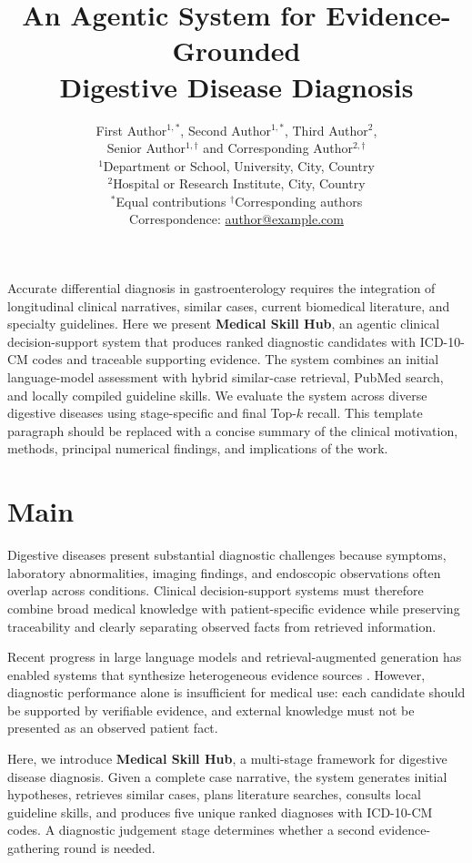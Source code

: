 \documentclass[10pt,letterpaper]{article}
\title{\vspace{-1.8em}\bfseries
An Agentic System for Evidence-Grounded\\
Digestive Disease Diagnosis}
\author{
First Author$^{1,*}$, Second Author$^{1,*}$, Third Author$^{2}$,\\
Senior Author$^{1,\dagger}$ and Corresponding Author$^{2,\dagger}$\\[0.55em]
\small $^{1}$Department or School, University, City, Country\\
\small $^{2}$Hospital or Research Institute, City, Country\\[0.35em]
\small $^{*}$Equal contributions \qquad $^{\dagger}$Corresponding authors\\
\small Correspondence: \href{mailto:author@example.com}{author@example.com}
}
\date{}
\newcommand{\systemname}{\textbf{Medical Skill Hub}}
\begin{document}
\maketitle
\thispagestyle{fancy}
\vspace{-1.5em}

Accurate differential diagnosis in gastroenterology requires the integration of
longitudinal clinical narratives, similar cases, current biomedical literature,
and specialty guidelines. Here we present \systemname{}, an agentic clinical
decision-support system that produces ranked diagnostic candidates with
ICD-10-CM codes and traceable supporting evidence. The system combines an
initial language-model assessment with hybrid similar-case retrieval, PubMed
search, and locally compiled guideline skills. We evaluate the system across
diverse digestive diseases using stage-specific and final Top-$k$ recall. This
template paragraph should be replaced with a concise summary of the clinical
motivation, methods, principal numerical findings, and implications of the work.

\section{Main}

Digestive diseases present substantial diagnostic challenges because symptoms,
laboratory abnormalities, imaging findings, and endoscopic observations often
overlap across conditions. Clinical decision-support systems must therefore
combine broad medical knowledge with patient-specific evidence while preserving
traceability and clearly separating observed facts from retrieved information.

Recent progress in large language models and retrieval-augmented generation has
enabled systems that synthesize heterogeneous evidence sources
\cite{singhal2023clinical,lewis2020retrieval}. However, diagnostic performance
alone is insufficient for medical use: each candidate should be supported by
verifiable evidence, and external knowledge must not be presented as an observed
patient fact.

Here, we introduce \systemname{}, a multi-stage framework for digestive disease
diagnosis. Given a complete case narrative, the system generates initial
hypotheses, retrieves similar cases, plans literature searches, consults local
guideline skills, and produces five unique ranked diagnoses with ICD-10-CM
codes. A diagnostic judgement stage determines whether a second evidence-
gathering round is needed.
\end{document}
